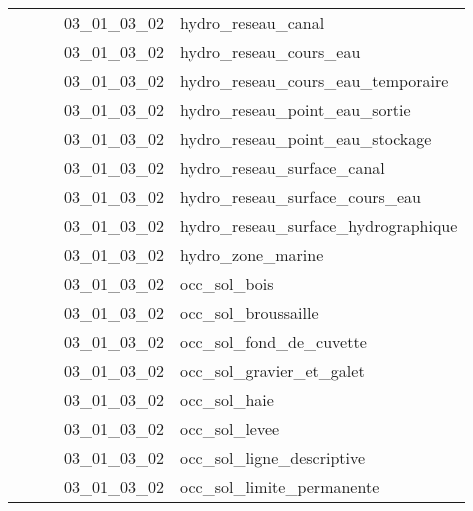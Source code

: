 \documentclass[12pt,titlepage,oneside]{book}
\begin{document}
\begin{supertabular}{|p{7.5cm}|p{7.5cm}|p{7.5cm}|c|p{10cm}|}
                   &                    &                    & 03\_01\_03\_02 & hydro\_reseau\_canal\\
                   &                    &                    & 03\_01\_03\_02 & hydro\_reseau\_cours\_eau\\
                   &                    &                    & 03\_01\_03\_02 & hydro\_reseau\_cours\_eau\_temporaire\\
                   &                    &                    & 03\_01\_03\_02 & hydro\_reseau\_point\_eau\_sortie\\
                   &                    &                    & 03\_01\_03\_02 & hydro\_reseau\_point\_eau\_stockage\\
                   &                    &                    & 03\_01\_03\_02 & hydro\_reseau\_surface\_canal\\
                   &                    &                    & 03\_01\_03\_02 & hydro\_reseau\_surface\_cours\_eau\\
                   &                    &                    & 03\_01\_03\_02 & hydro\_reseau\_surface\_hydrographique\\
                   &                    &                    & 03\_01\_03\_02 & hydro\_zone\_marine\\
                   &                    &                    & 03\_01\_03\_02 & occ\_sol\_bois\\
                   &                    &                    & 03\_01\_03\_02 & occ\_sol\_broussaille\\
                   &                    &                    & 03\_01\_03\_02 & occ\_sol\_fond\_de\_cuvette\\
                   &                    &                    & 03\_01\_03\_02 & occ\_sol\_gravier\_et\_galet\\
                   &                    &                    & 03\_01\_03\_02 & occ\_sol\_haie\\
                   &                    &                    & 03\_01\_03\_02 & occ\_sol\_levee\\
                   &                    &                    & 03\_01\_03\_02 & occ\_sol\_ligne\_descriptive\\
                   &                    &                    & 03\_01\_03\_02 & occ\_sol\_limite\_permanente\\

\end{supertabular}
\end{document}
